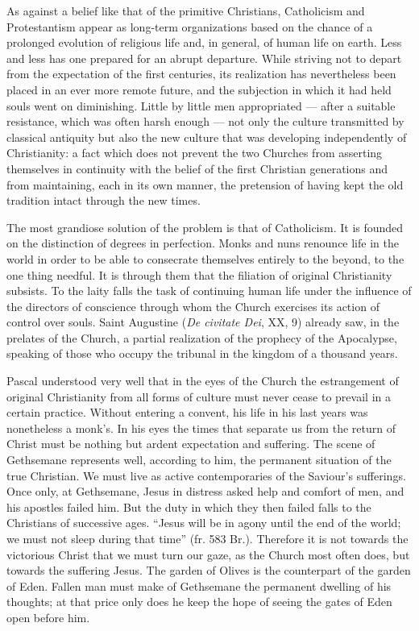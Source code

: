 \documentclass[12pt,a4paper]{article}
\newcommand{\opage}[1]{\marginnote{\footnotesize\textit{[#1]}}}
\begin{document}
As against a belief like that of the primitive Christians, Catholicism and
Protestantism appear as long-term organizations based on the chance of a
prolonged evolution of religious life and, in general, of human life on earth.
Less and less has one prepared for an abrupt departure. While striving not to
depart from the expectation of the first centuries, its realization has
nevertheless been placed in an ever more remote future, and the subjection in
which it had held souls went on diminishing. Little by little men appropriated
--- after a suitable resistance, which was often harsh enough --- not only the
culture transmitted by classical antiquity but also the new culture that was
developing independently of Christianity: a fact which does not prevent the two
Churches from asserting themselves in continuity with the belief of the first
Christian generations and from maintaining, each in its own manner, the
pretension of having kept the old tradition intact through the new times.

The most grandiose solution of the problem is that of Catholicism. It is founded
on the distinction of degrees in perfection. Monks and nuns renounce life in the
world in order to be able to consecrate themselves entirely to the beyond, to
the one thing needful. It is through them that the filiation of original
Christianity subsists. To the laity falls the task of continuing human life under
\opage{237}the influence of the directors of conscience through whom the Church exercises
its action of control over souls. Saint Augustine (\emph{De civitate Dei}, XX,
9) already saw, in the prelates of the Church, a partial realization of the
prophecy of the Apocalypse, speaking of those who occupy the tribunal in the
kingdom of a thousand years.

Pascal understood very well that in the eyes of the Church the estrangement of
original Christianity from all forms of culture must never cease to prevail in a
certain practice. Without entering a convent, his life in his last years was
nonetheless a monk's. In his eyes the times that separate us from the return of
Christ must be nothing but ardent expectation and suffering. The scene of
Gethsemane represents well, according to him, the permanent situation of the
true Christian. We must live as active contemporaries of the Saviour's
sufferings. Once only, at Gethsemane, Jesus in distress asked help and comfort
of men, and his apostles failed him. But the duty in which they then failed
falls to the Christians of successive ages. ``Jesus will be in agony until the
end of the world; we must not sleep during that time'' (fr. 583 Br.). Therefore
it is not towards the victorious Christ that we must turn our gaze, as the
Church most often does, but towards the suffering Jesus. The garden of Olives is
the counterpart of the garden of Eden. Fallen man must make of Gethsemane the
permanent dwelling of his thoughts; at that price only does he keep the hope of
seeing the gates of Eden open before him.
\end{document}
